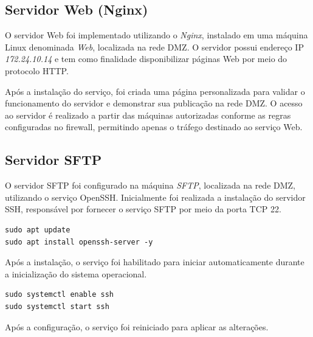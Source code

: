 \subsection{Servidor Web (Nginx)}

O servidor Web foi implementado utilizando o \textit{Nginx}, instalado em uma máquina Linux denominada \textit{Web}, localizada na rede DMZ. O servidor possui endereço IP \textit{172.24.10.14} e tem como finalidade disponibilizar páginas Web por meio do protocolo HTTP.

Após a instalação do serviço, foi criada uma página personalizada para validar o funcionamento do servidor e demonstrar sua publicação na rede DMZ. O acesso ao servidor é realizado a partir das máquinas autorizadas conforme as regras configuradas no firewall, permitindo apenas o tráfego destinado ao serviço Web.

\subsection{Servidor SFTP}

O servidor SFTP foi configurado na máquina \textit{SFTP}, localizada na rede DMZ, utilizando o serviço OpenSSH. Inicialmente foi realizada a instalação do servidor SSH, responsável por fornecer o serviço SFTP por meio da porta TCP 22.

\begin{listing}[H]
\centering
\begin{verbatim}
sudo apt update
sudo apt install openssh-server -y
\end{verbatim}
\caption{Instalação do serviço OpenSSH.}
\label{lst:installSSH}
\end{listing}

Após a instalação, o serviço foi habilitado para iniciar automaticamente durante a inicialização do sistema operacional.

\begin{listing}[H]
\centering
\begin{verbatim}
sudo systemctl enable ssh
sudo systemctl start ssh
\end{verbatim}
\caption{Inicialização do serviço SSH.}
\label{lst:startSSH}
\end{listing}

Após a configuração, o serviço foi reiniciado para aplicar as alterações.

